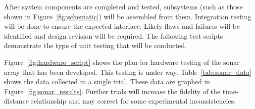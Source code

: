 \documentclass{article}
\begin{document}
    After system components are completed and tested,
    subsystems (such as those shown in Figure~\ref{fig:schematic})
    will be assembled from them.
    Integration testing will be done to ensure the expected interface.
    Likely flaws and failures will be identified
    and design revision will be required.
    The following test scripts demonstrate the type of unit testing
    that will be conducted.
    
    Figure~\ref{fig:hardware_script} shows the plan for hardware testing
    of the sonar array that has been developed.
    This testing is under way.
    Table~\ref{tab:sonar_data} shows the data collected in a single trial.
    These data are graphed in Figure~\ref{fig:sonar_results}.
    Further trials will increase the fidelity of the time-distance relationship
    and may correct for some experimental inconsistencies.
        
\end{document}
